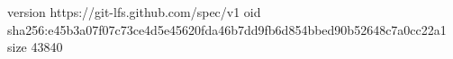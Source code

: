version https://git-lfs.github.com/spec/v1
oid sha256:e45b3a07f07c73ce4d5e45620fda46b7dd9fb6d854bbed90b52648c7a0cc22a1
size 43840
